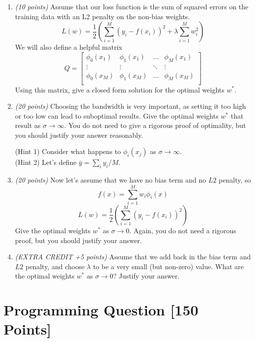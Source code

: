 \documentclass[letterpaper]{article}
\begin{document}
\begin{enumerate}

\item \textit{(10 points)}
Assume that our loss function is the sum of squared errors on the training data with an
L2 penalty on the non-bias weights.
\[
L(w) = \frac{1}{2}
\left(\sum_{i=1}^M (y_i - f(x_i))^2 +
\lambda \sum_{i=1}^M w_i^2 \right)
\]
We will also define a helpful matrix
\[
Q = 
\begin{bmatrix}
\phi_0(x_1) & \phi_1(x_1) & \dots & \phi_M(x_1) \\
\vdots & \vdots & \ddots & \vdots \\
\phi_0(x_M) & \phi_1(x_M) & \dots & \phi_M(x_M) \\
\end{bmatrix}
\]
Using this matrix, give a closed form solution for the optimal weights $w^*$.

\item \textit{(20 points)}
Choosing the bandwidth is very important, as setting it too high or too low can lead to
suboptimal results. Give the optimal weights $w^*$ that result as $\sigma \rightarrow \infty$.
You do not need to give a rigorous proof of optimality, but you should justify your answer
reasonably.

(Hint 1) Consider what happens to $\phi_i(x_j)$ as $\sigma \rightarrow \infty$. \\
(Hint 2) Let's define $\bar{y} = \sum_i y_i/M$.

\item \textit{(20 points)}
Now let's assume that we have no bias term and no $L2$ penalty, so
\[
f(x) = \sum_{i=1}^M w_i \phi_i(x)
\]
\[
L(w) = \frac{1}{2}
\left(\sum_{i=1}^M (y_i - f(x_i))^2 \right)
\]
Give the optimal weights $w^*$ as $\sigma \rightarrow 0$. Again, you do not need a rigorous
proof, but you should justify your answer.

\item \textit{(EXTRA CREDIT +5 points)}
Assume that we add back in the bias term and $L2$ penalty, and choose $\lambda$ to be
a very small (but non-zero) value. What are the optimal weights $w^*$ as
$\sigma \rightarrow 0$? Justify your answer.


\end{enumerate}


\section{Programming Question [150 Points]}
\end{document}
